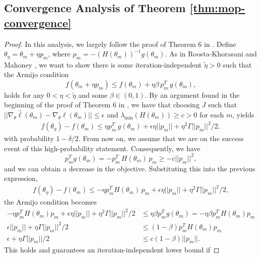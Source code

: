\subsection{Convergence Analysis of Theorem \ref{thm:mop-convergence}}

\begin{proof}
In this analysis, we largely follow the proof of Theorem 6 in \cite{mahoney16}.
Define $\theta_\eta = \theta_m + \eta p_m$, where $p_m=-(H(\theta_m))^{-1}g(\theta_m)$. 
As in Roosta-Khorasani and Mahoney \cite{mahoney16}, we want to show there is some iteration-independent $\tilde{\eta}>0$ such that the Armijo condition
\begin{equation}
    f(\theta_m+\eta p_m) \leq f(\theta_m) + \eta\beta \, p_m^T \, g(\theta_m),
\end{equation}
holds for any $0< \eta < \tilde{\eta}$ and some $\beta \in (0,1)$.
By an argument found in the beginning of the proof of Theorem 6 in \cite{mahoney16}, we have that choosing $J$ such that $||\nabla_\theta\hat{\ell}(\theta_m) - \nabla_\theta \ell(\theta_m)|| \leq \epsilon$ and $\lambda_{\min}(H(\theta_m)) \geq c>0$ for each $m$, yields
\begin{align}
    f(\theta_\eta)-f(\theta_m) \leq \eta p_m^T\, g(\theta_m) + \epsilon\eta||p_m|| + \eta^2 \Gamma ||p_m||^2 / 2,
\end{align}
with probability $1-\delta/2$. 
From now on, we assume that we are on the success event of this high-probability statement. 
Consequently, we have
\begin{equation}
    p_m^Tg(\theta_m) = -p_m^T\, H(\theta_m)\, p_m \geq -c||p_m||^2,
\end{equation}
and we can obtain a decrease in the objective. 
Substituting this into the previous expression,
\begin{align}
    f(\theta_\eta)-f(\theta_m) \leq -\eta p_m^TH(\theta_m)\, p_m + \epsilon\eta||p_m|| + \eta^2 \Gamma ||p_m||^2 / 2,
\end{align}
the Armijo condition becomes
\begin{align}
    -\eta p_m^TH(\theta_m)p_m + \epsilon\eta||p_m|| + \eta^2 \Gamma ||p_m||^2 / 2 &\leq \eta \beta p_m^Tg(\theta_m) = - \eta \beta p_m^TH(\theta_m)p_m \\
    \epsilon||p_m|| + \eta \Gamma ||p_m||^2 / 2 &\leq (1- \beta) p_m^TH(\theta_m)p_m \\
    \epsilon + \eta \Gamma ||p_m|| / 2 &\leq c(1- \beta) ||p_m||.
\end{align}
This holds and guarantees an iteration-independent lower bound if 

\end{proof}
